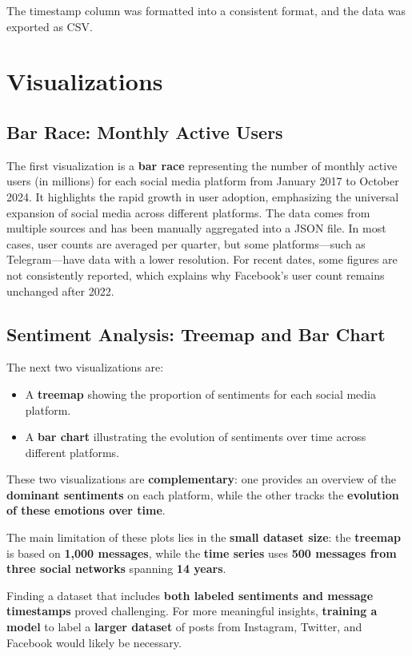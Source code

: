 \documentclass[a4paper,12pt,titlepage,leqno]{article}
\begin{document}
The timestamp column was formatted into a consistent format, and the data was exported as CSV.

\section{Visualizations}

\subsection{Bar Race: Monthly Active Users}
The first visualization is a \textbf{bar race} representing the number of monthly active users (in millions) for each social media platform from January 2017 to October 2024. It highlights the rapid growth in user adoption, emphasizing the universal expansion of social media across different platforms. The data comes from multiple sources and has been manually aggregated into a JSON file. In most cases, user counts are averaged per quarter, but some platforms—such as Telegram—have data with a lower resolution. For recent dates, some figures are not consistently reported, which explains why Facebook's user count remains unchanged after 2022.

\subsection{Sentiment Analysis: Treemap and Bar Chart}
The next two visualizations are:
\begin{itemize}
\item A \textbf{treemap} showing the proportion of sentiments for each social media platform.
\item A \textbf{bar chart} illustrating the evolution of sentiments over time across different platforms.
\end{itemize}

These two visualizations are \textbf{complementary}: one provides an overview of the \textbf{dominant sentiments} on each platform, while the other tracks the \textbf{evolution of these emotions over time}.

The main limitation of these plots lies in the \textbf{small dataset size}: the \textbf{treemap} is based on \textbf{1,000 messages}, while the \textbf{time series} uses \textbf{500 messages from three social networks} spanning \textbf{14 years}.

Finding a dataset that includes \textbf{both labeled sentiments and message timestamps} proved challenging. For more meaningful insights, \textbf{training a model} to label a \textbf{larger dataset} of posts from Instagram, Twitter, and Facebook would likely be necessary.
\end{document}

